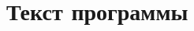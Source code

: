 \documentclass[bachelor, och, referat, times]{SCWorks}
\begin{document}
    
   
    
    \maketitle

    
    

    
    
   \tableofcontents
    
    
    
    

    \section{Текст программы}
    
\end{document}
